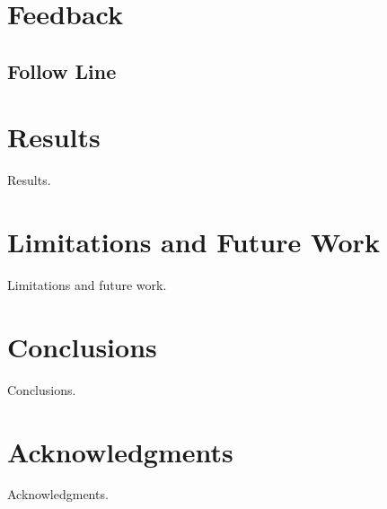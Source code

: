 \documentclass[conference]{acmsiggraph}
\begin{document}
\section{Feedback}

\subsection{Follow Line}



\section{Results}

Results.


\section{Limitations and Future Work}

Limitations and future work.


\section{Conclusions}

Conclusions.

\section{Acknowledgments}

Acknowledgments.



\end{document}
